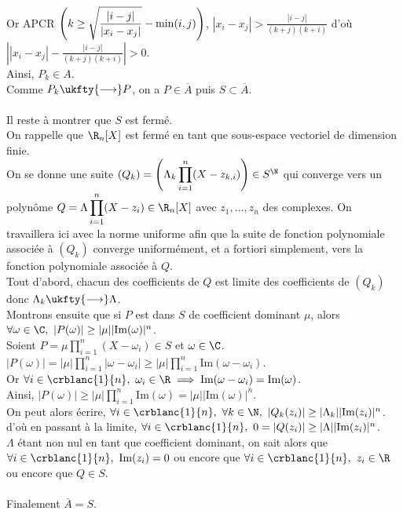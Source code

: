 \documentclass{book}
\begin{document}
\begin{enumerate}[leftmargin=*]
		Or APCR $\left(k\geq\displaystyle\displaystyle\sqrt{\frac{|i-j|}{|x_i-x_j|}}-\min(i,j)\right)$, $\displaystyle|x_i-x_j|>\frac{|i-j|}{(k+j)(k+i)}$ d'où $\displaystyle\left||x_i-x_j|-\frac{|i-j|}{(k+j)(k+i)}\right|>0$.\\
		Ainsi, $P_k\in A$.\\
		Comme $P_k\ukfty{\longrightarrow}P$, on a $P\in \overline{A}$ puis $S\subset \overline{A}$.\\\\
		Il reste à montrer que $S$ est fermé.\\
		On rappelle que $\R_n[X]$ est fermé en tant que sous-espace vectoriel de dimension finie.\\
		On se donne une suite $(Q_k)=\left(\Lambda_k\displaystyle\prod\limits_{i=1}^n(X-z_{k,i})\right)\in S^\N$ qui converge vers un polynôme $Q=\Lambda\displaystyle\prod\limits_{i=1}^n(X-z_i)\in \R_n[X]$ avec $z_1,\dots,z_n$ des complexes. On travaillera ici avec la norme uniforme afin que la suite de fonction polynomiale associée à $(Q_k)$ converge uniformément, et a fortiori simplement, vers la fonction polynomiale associée à $Q$.\\
		Tout d'abord, chacun des coefficients de $Q$ est limite des coefficients de $(Q_k)$ donc $\Lambda_k\ukfty{\longrightarrow}\Lambda$.\\
		Montrons ensuite que si $P$ est dans $S$ de coefficient dominant $\mu$, alors $\forall \omega\in \C,\ |P(\omega)|\geq |\mu||\text{Im}(\omega)|^n$.\\
		Soient $P=\mu\displaystyle\prod\limits_{i=1}^n(X-\omega_i)\in S$ et $\omega\in \C$.\\
		$|P(\omega)|=|\mu|\displaystyle\prod\limits_{i=1}^n|\omega-\omega_i|\geq |\mu|\prod\limits_{i=1}^n\text{Im}(\omega-\omega_i)$.\\
		Or $\forall i\in \crblanc{1}{n},\ \omega_i\in \R\implies \text{Im}(\omega-\omega_i)=\text{Im}(\omega)$.\\
		Ainsi, $|P(\omega)|\geq|\mu|\displaystyle\prod\limits_{i=1}^n\text{Im}(\omega)=|\mu||\text{Im}(\omega)|^n$.\\
		On peut alors écrire, $\forall i\in \crblanc{1}{n},\ \forall k\in \N,\ |Q_k(z_i)|\geq |\Lambda_k||\text{Im}(z_i)|^n$.\\
		d'où en passant à la limite, $\forall i\in \crblanc{1}{n},\ 0=|Q(z_i)|\geq |\Lambda||\text{Im}(z_i)|^n$.\\
		$\Lambda$ étant non nul en tant que coefficient dominant, on sait alors que $\forall i\in\crblanc{1}{n},\ \text{Im}(z_i)=0$ ou encore que $\forall i\in \crblanc{1}{n},\ z_i\in \R$ ou encore que $Q\in S$.\\\\
		Finalement $\overline{A}=S$.
	\end{enumerate}
	
\end{document}
